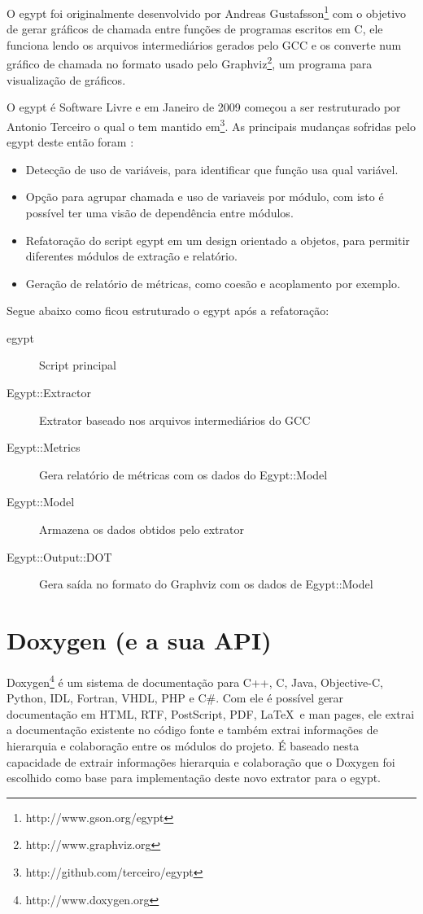 O egypt foi originalmente desenvolvido por Andreas
Gustafsson\footnote{http://www.gson.org/egypt} com o objetivo de gerar gráficos
de chamada entre funções de programas escritos em C, ele funciona lendo os
arquivos intermediários gerados pelo GCC e os
converte num gráfico de chamada no formato usado pelo
Graphviz\footnote{http://www.graphviz.org}, um programa para visualização de
gráficos.

O egypt é Software Livre e em Janeiro de 2009 começou a ser restruturado por
Antonio Terceiro o qual o tem mantido
em\footnote{http://github.com/terceiro/egypt}. As principais mudanças sofridas
pelo egypt deste então foram \cite{StructuralComplexityEvolution}:

\begin{itemize}
\item Detecção de uso de variáveis, para identificar que função usa qual
variável.
\item Opção para agrupar chamada e uso de variaveis por módulo, com isto é
possível ter uma visão de dependência entre módulos.
\item Refatoração do script egypt em um design orientado a objetos, para
permitir diferentes módulos de extração e relatório.
\item Geração de relatório de métricas, como coesão e acoplamento por exemplo.
\end{itemize}

Segue abaixo como ficou estruturado o egypt após a refatoração:

\begin{description}
\item[egypt] Script principal
\item[Egypt::Extractor] Extrator baseado nos arquivos intermediários do GCC
\item[Egypt::Metrics] Gera relatório de métricas com os dados do Egypt::Model
\item[Egypt::Model] Armazena os dados obtidos pelo extrator
\item[Egypt::Output::DOT] Gera saída no formato do Graphviz com os dados de Egypt::Model
\end{description}

\section{Doxygen (e a sua API)}

Doxygen\footnote{http://www.doxygen.org} é um sistema de documentação para C++,
C, Java, Objective-C, Python, IDL, Fortran, VHDL, PHP e C\#. Com ele é possível
gerar documentação em HTML, RTF, PostScript, PDF, \LaTeX\ e man pages, ele
extrai a documentação existente no código fonte e também extrai informações de
hierarquia e colaboração entre os módulos do projeto. É baseado nesta
capacidade de extrair informações hierarquia e colaboração que o Doxygen foi
escolhido como base para implementação deste novo extrator para o egypt.


